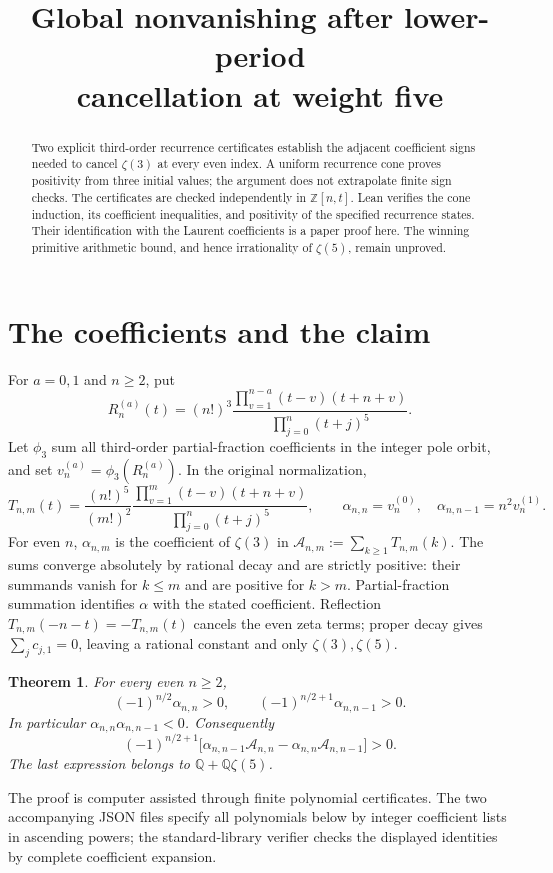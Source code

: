 \documentclass[11pt]{article}
\title{Global nonvanishing after lower-period\\cancellation at weight five}
\author{}
\date{}
\newtheorem{theorem}{Theorem}
\newcommand{\Q}{\mathbb Q}
\newcommand{\Z}{\mathbb Z}
\begin{document}
\maketitle
\begin{abstract}
Two explicit third-order recurrence certificates establish the adjacent
coefficient signs needed to cancel $\zeta(3)$ at every even index.
A uniform recurrence cone proves positivity from three initial values;
the argument does not extrapolate finite sign checks. The certificates
are checked independently in $\Z[n,t]$. Lean verifies the cone induction,
its coefficient inequalities, and positivity of the specified recurrence
states. Their identification with the Laurent coefficients is a paper
proof here. The winning primitive arithmetic bound, and hence
irrationality of $\zeta(5)$, remain unproved.
\end{abstract}

\section{The coefficients and the claim}
For $a=0,1$ and $n\ge2$, put
\[
 R_n^{(a)}(t)=(n!)^3
 \frac{\prod_{v=1}^{n-a}(t-v)(t+n+v)}
      {\prod_{j=0}^n(t+j)^5}.
\]
Let $\phi_3$ sum all third-order partial-fraction coefficients in the integer
pole orbit, and set $v_n^{(a)}=\phi_3(R_n^{(a)})$. In the original normalization,
\[
 T_{n,m}(t)=\frac{(n!)^5}{(m!)^2}
 \frac{\prod_{v=1}^m(t-v)(t+n+v)}{\prod_{j=0}^n(t+j)^5},
 \qquad
 \alpha_{n,n}=v_n^{(0)},\quad \alpha_{n,n-1}=n^2v_n^{(1)}.
\]
For even $n$, $\alpha_{n,m}$ is the coefficient of $\zeta(3)$ in
$\mathcal A_{n,m}:=\sum_{k\ge1}T_{n,m}(k)$.
The sums converge absolutely by rational decay and are strictly positive:
their summands vanish for $k\le m$ and are positive for $k>m$.
Partial-fraction summation identifies $\alpha$ with the stated coefficient.
Reflection $T_{n,m}(-n-t)=-T_{n,m}(t)$ cancels the even zeta terms;
proper decay gives $\sum_jc_{j,1}=0$, leaving a rational constant and
only $\zeta(3),\zeta(5)$.

\begin{theorem}
For every even $n\ge2$,
\[
 (-1)^{n/2}\alpha_{n,n}>0,\qquad
 (-1)^{n/2+1}\alpha_{n,n-1}>0.
\]
In particular $\alpha_{n,n}\alpha_{n,n-1}<0$. Consequently
\[
 (-1)^{n/2+1}\bigl[
 \alpha_{n,n-1}\mathcal A_{n,n}
 -\alpha_{n,n}\mathcal A_{n,n-1}\bigr]>0.
\]
The last expression belongs to $\Q+\Q\zeta(5)$.
\end{theorem}

The proof is computer assisted through finite polynomial certificates.
The two accompanying JSON files specify all polynomials below by integer
coefficient lists in ascending powers; the standard-library verifier
checks the displayed identities by complete coefficient expansion.
\end{document}

